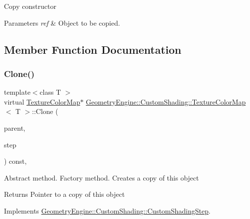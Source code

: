 Copy constructor 
\begin{DoxyParams}{Parameters}
{\em ref} & Object to be copied. \\
\hline
\end{DoxyParams}


\subsection{Member Function Documentation}
\mbox{\label{class_geometry_engine_1_1_custom_shading_1_1_texture_color_map_a6ad5122de9e2e82000a69b9a777845b1}} 
\subsubsection{\texorpdfstring{Clone()}{Clone()}}
{\footnotesize\ttfamily template$<$class T $>$ \\
virtual \mbox{\hyperlink{class_geometry_engine_1_1_custom_shading_1_1_texture_color_map}{Texture\+Color\+Map}}$\ast$ \mbox{\hyperlink{class_geometry_engine_1_1_custom_shading_1_1_texture_color_map}{Geometry\+Engine\+::\+Custom\+Shading\+::\+Texture\+Color\+Map}}$<$ T $>$\+::Clone (\begin{DoxyParamCaption}\item[{\mbox{\hyperlink{class_geometry_engine_1_1_custom_shading_1_1_custom_shading_interface}{Custom\+Shading\+Interface}} $\ast$}]{parent,  }\item[{\mbox{\hyperlink{namespace_geometry_engine_1_1_custom_shading_a2dc236a5b567da5099069ce2b2be5609}{Custom\+Shading\+Steps}}}]{step }\end{DoxyParamCaption}) const\hspace{0.3cm}{\ttfamily [inline]}, {\ttfamily [virtual]}}

Abstract method. Factory method. Creates a copy of this object \begin{DoxyReturn}{Returns}
Pointer to a copy of this object 
\end{DoxyReturn}


Implements \mbox{\hyperlink{class_geometry_engine_1_1_custom_shading_1_1_custom_shading_step_aa9279c195d3a8f294860a431508675c3}{Geometry\+Engine\+::\+Custom\+Shading\+::\+Custom\+Shading\+Step}}.


